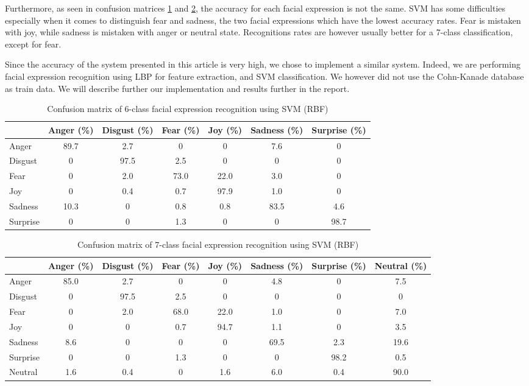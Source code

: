 \noindent Furthermore, as seen in confusion matrices \ref{conf_mtx_6_svm_lbp} and \ref{conf_mtx_7_svm_lbp}, the accuracy for each facial expression is not the same. SVM has some difficulties especially when it comes to distinguish fear and sadness, the two facial expressions which have the lowest accuracy rates. Fear is mistaken with joy, while sadness is mistaken with anger or neutral state. Recognitions rates are however usually better for a 7-class classification, except for fear.
\newline

\noindent Since the accuracy of the system presented in this article is very high, we chose to implement a similar system. Indeed, we are performing facial expression recognition using LBP for feature extraction, and SVM classification. We however did not use the Cohn-Kanade database as train data. We will describe further our implementation and results further in the report. 
\newline

\begin{table}[h]
\caption{\label{conf_mtx_6_svm_lbp} Confusion matrix of 6-class facial expression recognition using SVM (RBF)}
\begin{tabular}{|lcccccc|}
\hline
 & Anger (\%) & Disgust (\%) & Fear (\%) & Joy (\%) & Sadness (\%) & Surprise (\%) \\
\hline
Anger & 89.7 & 2.7 & 0 & 0 & 7.6 & 0 \\
Disgust & 0 & 97.5 & 2.5 & 0 & 0 & 0 \\
Fear & 0 & 2.0 & 73.0 & 22.0 & 3.0 & 0 \\
Joy & 0 & 0.4 & 0.7 & 97.9 & 1.0 & 0 \\
Sadness & 10.3 & 0 & 0.8 & 0.8 & 83.5 & 4.6 \\
Surprise & 0 & 0 & 1.3 & 0 & 0 & 98.7 \\
\hline
\end{tabular}
\end{table}

\begin{table}[h]
\caption{\label{conf_mtx_7_svm_lbp} Confusion matrix of 7-class facial expression recognition using SVM (RBF)}
\begin{tabular}{|lccccccc|}
\hline
& Anger (\%) & Disgust (\%) & Fear (\%) & Joy (\%) & Sadness (\%) & Surprise (\%) & Neutral (\%) \\
\hline
Anger & 85.0 & 2.7 & 0 & 0 & 4.8 & 0 & 7.5 \\
Disgust & 0 & 97.5 & 2.5 & 0 & 0 & 0 & 0 \\
Fear & 0 & 2.0 & 68.0 & 22.0 & 1.0 & 0 & 7.0 \\
Joy & 0 & 0 & 0.7 & 94.7  & 1.1 & 0 & 3.5 \\
Sadness & 8.6 & 0 & 0 & 0 & 69.5 & 2.3 & 19.6 \\
Surprise & 0 & 0 & 1.3 & 0 & 0 & 98.2 & 0.5 \\
Neutral & 1.6 & 0.4 & 0 & 1.6 & 6.0 & 0.4 & 90.0 \\
\hline
\end{tabular}
\end{table}
